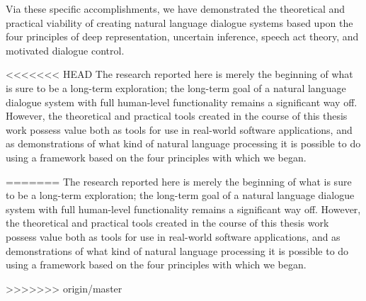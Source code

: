 \begin{englishabstract}
\begin{itemize}
\begin{itemize}
\end{itemize}

Via these specific accomplishments, we have demonstrated the theoretical and practical viability of creating natural language dialogue systems based upon the four principles of deep representation, uncertain inference, speech act theory, and motivated dialogue control.  

<<<<<<< HEAD
The research reported here is merely the beginning of what is sure to be a long-term exploration; the long-term goal of a natural language dialogue system with full human-level functionality remains a significant way off.  However, the theoretical and practical tools created in the course of this thesis work possess value both as tools for use in real-world software applications, and as demonstrations of what kind of natural language processing it is possible to do using a framework based on the four principles with which we began.



=======
The research  reported here is merely the beginning of what is sure to be a long-term exploration; the long-term goal of a natural language dialogue system with full human-level functionality remains a significant way off.    However, the theoretical and practical tools created in the course of this thesis work possess value both as tools for use in real-world software applications, and as demonstrations of what kind of natural language processing it is possible to do using a framework based on the four principles with which we began.



>>>>>>> origin/master
\end{englishabstract}
